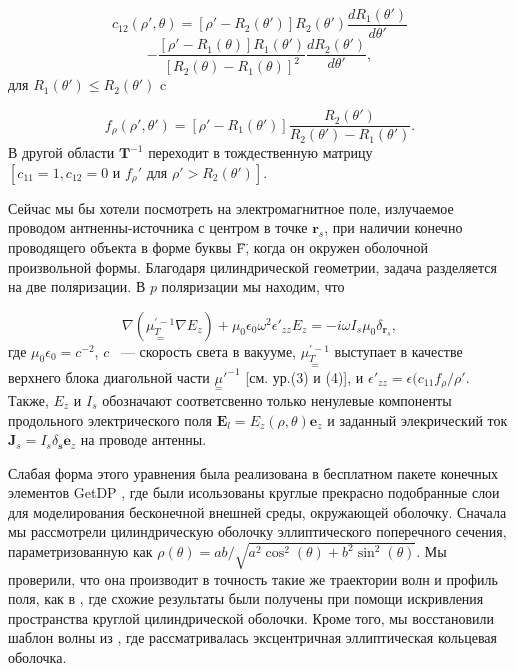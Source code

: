 \documentclass[a4paper, 12pt]{article}
\begin{document}
\begin{equation*}
c_{12}(\rho',\theta)=[\rho'-R_2(\theta')]R_2(\theta')\frac{dR_1(\theta')}{d\theta'}	
\end{equation*}
\begin{equation}
	-\frac{[\rho'-R_1(\theta)]R_1(\theta')}{[R_2(\theta)-R_1(\theta)]^2}
	\frac{dR_2(\theta')}{d\theta'},
\end{equation}
для $R_1(\theta') \le R_2(\theta')$ c 

\begin{equation}
	f_\rho(\rho',\theta') = [\rho'-R_1(\theta')]
	\frac{R_2(\theta')}{R_2(\theta')-R_1(\theta')}.	
\end{equation}
В другой области $\mathbf{T}^{-1}$ переходит в тождественную матрицу
$[c_{11}=1, c_{12}=0 \text{ и } f_\rho' \text{ для } \rho'>R_2(\theta')]$.

Сейчас мы бы хотели посмотреть на электромагнитное поле, излучаемое 
проводом антненны-источника с центром в точке $\mathbf{r}_s$, при
наличии конечно проводящего объекта в форме буквы \"F\", когда он окружен
оболочной произвольной формы. Благодаря цилиндрической геометрии, 
задача разделяется на две поляризации. В $p$ поляризации
мы находим, что 

\begin{equation}
\nabla (\underset{=}{\mu_T^{'-1}}\nabla E_z)+\mu_0\epsilon_0\omega^2\epsilon'_{zz}
E_z = -i\omega I_s\mu_0\delta_{\mathbf{r}_s},	
\end{equation}
где $\mu_0\epsilon_0=c^{-2}$, $c$ ~--- скорость света в вакууме,
$\underset{=}{\mu_T^{'-1}}$ выступает в качестве верхнего блока диагольной части
$\underset{=}\mu'^{-1}$ [см. ур.(3) и (4)], и 
$\epsilon'_{zz}=\epsilon(c_{11}f_\rho/\rho'$. Также, $E_z$ и $I_s$ обозначают
соответсвенно только ненулевые компоненты продольного электрического поля
$\mathbf{E}_l=E_z(\rho,\theta)\mathbf{e}_z$ и заданный элекрический ток
$\mathbf{J}_s=I_s\delta_{\mathbf{s}}\mathbf{e}_z$ на проводе антенны.

Слабая форма этого уравнения была реализована в бесплатном пакете конечных
элементов GetDP \cite{15}, где были исользованы круглые прекрасно подобранные
слои для моделирования бесконечной внешней среды, окружающей оболочку.
Сначала мы рассмотрели цилиндрическую оболочку эллиптического поперечного сечения,
параметризованную как $\rho(\theta)=ab/\sqrt{a^2\cos^2(\theta)+b^2\sin^2(\theta)}$.
Мы проверили, что она производит в точность такие же траектории волн и профиль 
поля, как в \cite{12}, где схожие результаты были получены при помощи 
искривления пространства круглой цилиндрической оболочки. Кроме того,
мы восстановили шаблон волны из \cite{11}, где рассматривалась
эксцентричная эллиптическая кольцевая оболочка.
\end{document}
